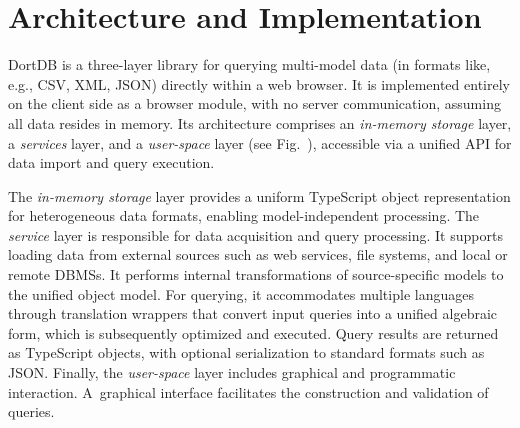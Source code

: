 




\section{Architecture and Implementation}

DortDB is a three-layer library for querying multi-model data (in formats like, e.g., CSV, XML, JSON) directly within a web browser. It is implemented entirely on the client side as a browser module, with no server communication, assuming all data resides in memory. Its architecture comprises an \textit{in-memory storage} layer, a \textit{services} layer, and a \textit{user-space} layer (see Fig.~), accessible via a unified API for data import and query execution.

The \textit{in-memory storage} layer provides a uniform TypeScript object representation for heterogeneous data formats, enabling model-independent processing. The \textit{service} layer is responsible for data acquisition and query processing. It supports loading data from external sources such as web services, file systems, and local or remote DBMSs. It performs internal transformations of source-specific models to the unified object model. For querying, it accommodates multiple languages through translation wrappers that convert input queries into a unified algebraic form, which is subsequently optimized and executed. Query results are returned as TypeScript objects, with optional serialization to standard formats such as JSON. Finally, the \textit{user-space} layer includes graphical and programmatic interaction. A~graphical interface facilitates the construction and validation of queries. %


